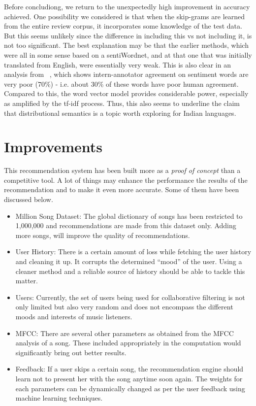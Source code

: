 Before concludiong, we return to the unexpectedly high improvement in accuracy achieved. One possibility we considered is that when the skip-grams are learned from the entire review corpus, it incorporates some knowledge of the test data.  But this seems unlikely since the difference in including this vs not including it, is not too significant.  The best explanation may be that the earlier methods, which were all in some sense based on a sentiWordnet, and at that one that was initially translated from English, were essentially very weak.  This is also clear in an analysis from
~\cite{Bakliwal:12}, which shows intern-annotator agreement on sentiment words are very poor (70\%) - i.e. about 30\% of these words have poor human agreement. Compared to this, the word vector model  
provides considerable power, especially as amplified by the tf-idf process. Thus, this also seems to underline the claim that distributional semantics is a topic worth exploring for Indian languages. 

	\section{Improvements}
		This recommendation system has been built more as a \emph{proof of concept} than a competitive tool. A lot of things may enhance the performance the results of the recommendation and to make it even more accurate. Some of them have been discussed below.

 \begin{itemize}
 	\item Million Song Dataset: The global dictionary of songs has been restricted to 1,000,000 and recommendations are made from this dataset only. Adding more songs, will improve the quality of recommendations.
 	\item User History: There is a certain amount of loss while fetching the user history and cleaning it up. It corrupts the determined ``mood'' of the user. Using a cleaner method and a reliable source of history should be able to tackle this matter.
 	\item Users: Currently, the set of users being used for collaborative filtering is not only limited but also very random and does not encompass the different moods and interests of music listeners.
 	\item MFCC: There are several other parameters as obtained from the MFCC analysis of a song. These included appropriately in the computation would significantly bring out better results.
 	\item Feedback: If a user skips a certain song, the recommendation engine should learn not to present her with the song anytime soon again. The weights for each parameters can be dynamically changed as per the user feedback using machine learning techniques.
 \end{itemize} 
	
